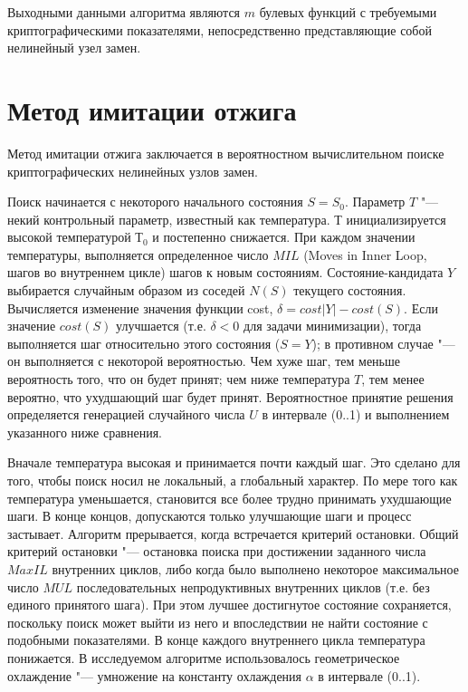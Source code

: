 Выходными данными алгоритма являются $m$ булевых функций с требуемыми
криптографическими показателями, непосредственно представляющие собой нелинейный
узел замен.

\section{Метод имитации отжига}
\label{section:simulated_annealing}

Метод имитации отжига заключается в вероятностном вычислительном поиске
криптографических нелинейных узлов замен.

Поиск начинается с некоторого начального состояния $S=S_0$. Параметр $T$ "---
некий контрольный параметр, известный как температура. $Т$ инициализируется
высокой температурой $Т_0$ и постепенно снижается. При каждом значении
температуры, выполняется определенное число $MIL$ (Moves in Inner Loop, шагов во
внутреннем цикле) шагов к новым состояниям. Состояние-кандидата $Y$ выбирается
случайным образом из соседей $N(S)$ текущего состояния. Вычисляется изменение
значения функции cost, $\delta=cost|Y| - cost(S)$. Если значение $cost(S)$
улучшается (т.е. $\delta < 0$ для задачи минимизации), тогда выполняется шаг
относительно этого состояния ($S = Y$); в противном случае "--- он выполняется с
некоторой вероятностью. Чем хуже шаг, тем меньше вероятность того, что он будет
принят; чем ниже температура $T$, тем менее вероятно, что ухудшающий шаг будет
принят. Вероятностное принятие решения определяется генерацией случайного числа
$U$ в интервале (0..1) и выполнением указанного ниже сравнения.

Вначале температура высокая и принимается почти каждый шаг. Это сделано для
того, чтобы поиск носил не локальный, а глобальный характер. По мере того как
температура уменьшается, становится все более трудно принимать ухудшающие шаги.
В конце концов, допускаются только улучшающие шаги и процесс застывает. Алгоритм
прерывается, когда встречается критерий остановки. Общий критерий остановки "---
остановка поиска при достижении заданного числа $MaxIL$ внутренних циклов, либо
когда было выполнено некоторое максимальное число $MUL$ последовательных
непродуктивных внутренних циклов (т.е. без единого принятого шага). При этом
лучшее достигнутое состояние сохраняется, поскольку поиск может выйти из него и
впоследствии не найти состояние с подобными показателями. В конце каждого
внутреннего цикла температура понижается. В исследуемом алгоритме использовалось
геометрическое охлаждение "--- умножение на константу охлаждения $\alpha$ в
интервале (0..1).

